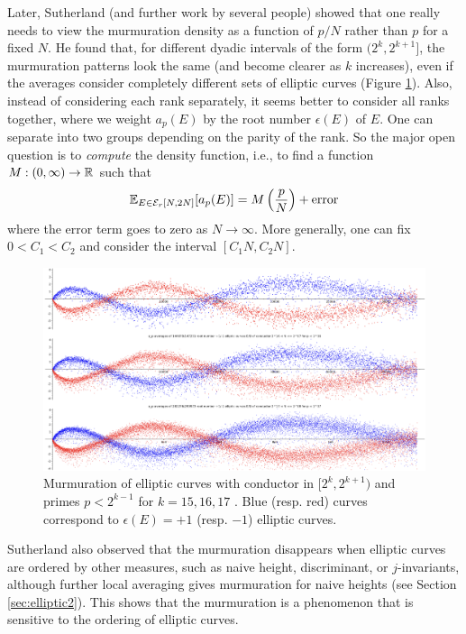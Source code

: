 Later, Sutherland \cite{sutherlandletter} (and further work by several people) showed that one really needs to view the murmuration density as a function of $p / N$ rather than $p$ for a fixed $N$.
He found that, for different dyadic intervals of the form $(2^k, 2^{k+1}]$, the murmuration patterns look the same (and become clearer as $k$ increases), even if the averages consider completely different sets of elliptic curves (Figure \ref{fig:sutherland_elliptic_dyadic}).
Also, instead of considering each rank separately, it seems better to consider all ranks together, where we weight $a_p(E)$ by the root number $\epsilon(E)$ of $E$.
One can separate into two groups depending on the parity of the rank.
So the major open question is to \emph{compute} the density function, i.e., to find a function $M: (0, \infty) \to \mathbb{R}$ such that
\begin{equation}
    \mathbb{E}_{E \in \mathcal{E}_r[N, 2N]} [a_p(E)] = M\left(\frac{p}{N}\right) + \text{error}
\end{equation}
where the error term goes to zero as $N \to \infty$. More generally, one can fix $0 < C_1 < C_2$ and consider the interval $[C_1 N, C_2 N]$.

\begin{figure}[htp] 
    \includegraphics[width=\textwidth]{src/sutherland.png}%
    \caption{Murmuration of elliptic curves with conductor in $[2^{k}, 2^{k+1})$ and primes $p < 2^{k-1}$ for $k = 15, 16, 17$ \cite{sutherlandletter}. Blue (resp. red) curves correspond to $\epsilon(E) = +1$ (resp. $-1$) elliptic curves.}
\label{fig:sutherland_elliptic_dyadic}
\end{figure}


Sutherland also observed that the murmuration disappears when elliptic curves are ordered by other measures, such as naive height, discriminant, or $j$-invariants, although further local averaging gives murmuration for naive heights (see Section \ref{sec:elliptic2}).
This shows that the murmuration is a phenomenon that is sensitive to the ordering of elliptic curves.


